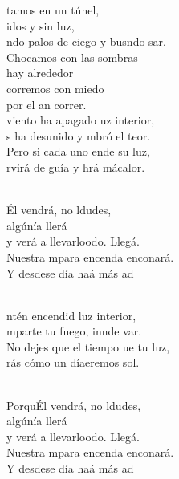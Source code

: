 \documentclass[12pt]{article}
\begin{document}
\begin{multicols*}{2}
\begin{cancion}%
	tamos en un túnel, \\
	idos y sin luz,\\
	ndo palos de ciego y busndo sar.\\
Chocamos con las sombras \\
	hay alrededor\\
	corremos con miedo \\
	por el an correr.\\
	 viento ha apagado uz interior,\\
	s ha desunido y mbró el teor.\\
	Pero si cada uno ende su luz,\\
	rvirá de guía y hrá mácalor.\\\jump\\
	\begin{chorus}%
	Él vendrá, no ldudes, \\
	algúnía llerá\\
	y verá a llevarloodo. Llegá. \\
	Nuestra mpara encenda enconará. \\
	Y desdese día haá más ad\\
	\end{chorus}%
	\jump\\
	ntén encendid luz interior,\\
	mparte tu fuego, innde var.\\
	No dejes que el tiempo ue tu luz,\\
	rás cómo un díaeremos  sol.\\\jump\\
	\begin{chorus}%
	PorquÉl vendrá, no ldudes, \\
	algúnía llerá\\
	y verá a llevarloodo. Llegá. \\
	Nuestra mpara encenda enconará. \\
	Y desdese día haá más ad\\
	\end{chorus}%
	\jump\\
\end{cancion}%


\end{multicols*}
\end{document}

